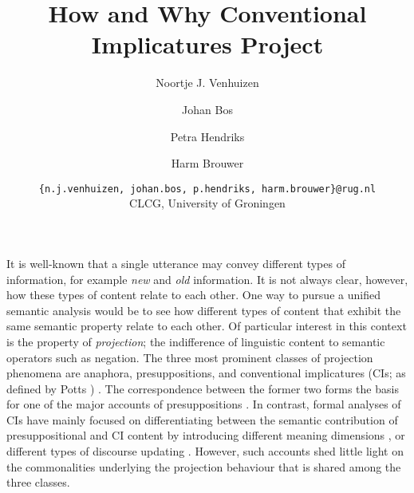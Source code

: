 \documentclass[letterpaper,11pt]{article}
\title{\vspace{-2em} How and Why Conventional Implicatures Project}
\date{}
\author{Noortje J. Venhuizen \and Johan Bos \and Petra Hendriks \and Harm Brouwer \and
  \texttt{\{n.j.venhuizen, johan.bos, p.hendriks, harm.brouwer\}@rug.nl}\\  
CLCG, University of Groningen
\vspace{-2em}}
\begin{document}
\normalsize
\maketitle

\pagestyle{empty}
\thispagestyle{empty}



\noindent 
It is well-known that a single utterance may convey different types of
information, for example \emph{new} and \emph{old} information. It is not
always clear, however, how these types of content relate to each other.
One way to pursue a unified semantic analysis would be to see how different
types of content that exhibit the same semantic property relate to each
other. Of particular interest in this context is the property of
\textit{projection}; the indifference of linguistic content to semantic
operators such as negation. The three most prominent classes of projection
phenomena are anaphora, presuppositions, and conventional implicatures (CIs;
as defined by Potts \cite{potts2005logic}) \cite{simons2010projects}.
The correspondence between the former two forms the basis for one of the
major accounts of presuppositions
\citep{sandt1992presupposition-short,geurts1999presuppositions}. In
contrast, formal analyses of CIs have mainly focused on differentiating
between the semantic contribution of presuppositional and CI content by
introducing different meaning dimensions
\cite{potts2005logic,nouwen2007appositives-short}, or different types of
discourse updating \citep{anderbois2010crossing}. However, such accounts
shed little light on the commonalities underlying the projection behaviour
that is shared among the three classes.
\end{document}
